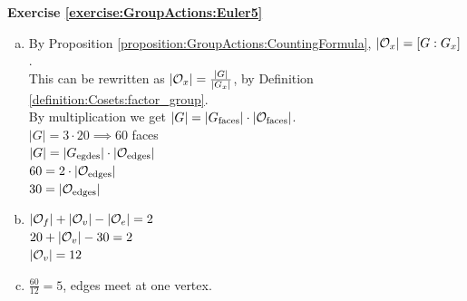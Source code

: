 \noindent\textbf{Exercise \ref{exercise:GroupActions:Euler5}}
\begin{enumerate}[(a)]
\item
By Proposition \ref{proposition:GroupActions:CountingFormula}, $|{\cal O}_x| = [G : G_x]$.  
\\
This can be rewritten as $|{\cal O}_x| = \frac{|G|}{|{G_x|}}$, by Definition \ref{definition:Cosets:factor_group}.
\\
By multiplication we get $|G| = |G_\text{faces}| \cdot |{\cal O}_\text{faces}|$. 
\\
$|G| = 3 \cdot 20 \implies 60$ faces
\\
$|G| = |G_\text{egdes}| \cdot |{\cal O}_\text{edges}|$
\\
$60 = 2 \cdot |{\cal O}_\text{edges}|$
\\
$30 = |{\cal O}_\text{edges}|$

\item
$|{\cal O}_f| + |{\cal O}_v| - |{\cal O}_e| = 2$
\\
$20 +  |{\cal O}_v| -30 = 2$
\\
$ |{\cal O}_v| = 12$

\item
$\frac{60}{12} = 5$, edges meet at one vertex.
\end{enumerate}
 

